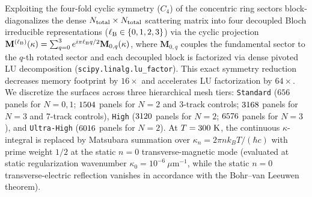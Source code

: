 \documentclass[pdflatex,sn-nature]{sn-jnl}
\begin{document}
Exploiting the four-fold cyclic symmetry ($C_4$) of the concentric ring sectors block-diagonalizes the dense $N_{\rm total} \times N_{\rm total}$ scattering matrix into four decoupled Bloch irreducible representations ($\ell_{\rm B} \in \{0, 1, 2, 3\}$) via the cyclic projection $\mathbf{M}^{(\ell_{\rm B})}(\kappa) = \sum_{q=0}^{3} e^{i\pi \ell_{\rm B} q/2}\mathbf{M}_{0,q}(\kappa)$, where $\mathbf{M}_{0,q}$ couples the fundamental sector to the $q$-th rotated sector and each decoupled block is factorized via dense pivoted LU decomposition (\texttt{scipy.linalg.lu\_factor}). This exact symmetry reduction decreases memory footprint by $16\times$ and accelerates LU factorization by $64\times$. We discretize the surfaces across three hierarchical mesh tiers: \texttt{Standard} ($656$ panels for $N=0,1$; $1504{}$ panels for $N=2$ and 3-track controls; $3168{}$ panels for $N=3$ and 7-track controls), \texttt{High} ($3120{}$ panels for $N=2$; $6576{}$ panels for $N=3$), and \texttt{Ultra-High} ($6016{}$ panels for $N=2$). At $T = 300{}\text{ K}$, the continuous $\kappa$-integral is replaced by Matsubara summation over $\kappa_n = 2\pi n k_B T / (\hbar c)$ with prime weight $1/2$ at the static $n=0$ transverse-magnetic mode (evaluated at static regularization wavenumber $\kappa_0 = 10^{-6}\ \mu\text{m}^{-1}$, while the static $n=0$ transverse-electric reflection vanishes in accordance with the Bohr--van Leeuwen theorem).
\end{document}
